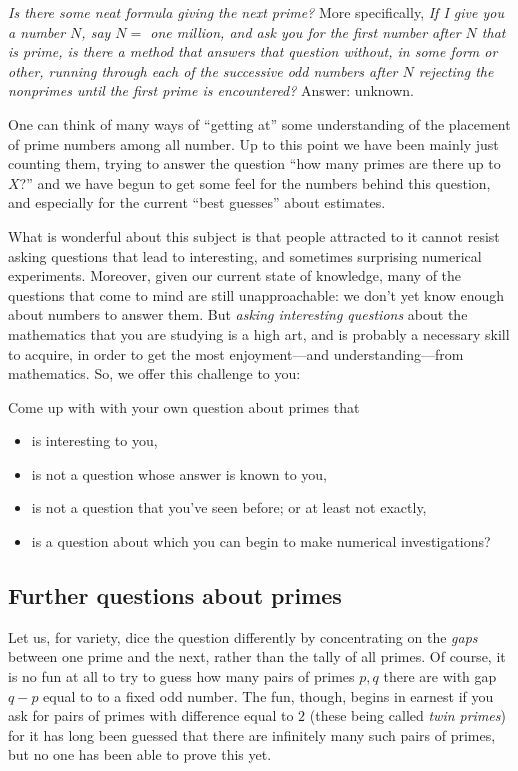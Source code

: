 \documentclass[11pt]{article}
\theoremstyle{plain}
\theoremstyle{definition}
\numberwithin{equation}{section}
\numberwithin{figure}{section}
\numberwithin{table}{section}
\begin{document}
{\em Is there some neat formula giving the next prime?} More
specifically, {\em If I give you a number $N$, say $N=$ one million,
  and ask you for the first number after $N$ that is prime, is there a
  method that answers that question without, in some form or other,
  running through each of the successive odd numbers after $N$ rejecting
  the nonprimes until the first prime is encountered?}  Answer:
unknown.

\bigskip

One can think of many ways of ``getting at'' some understanding of the
placement of prime numbers among all number.  Up to this point we have
been mainly just counting them, trying to answer the question ``how
many primes are there up to $X$?''  and we have begun to get some feel
for the numbers behind this question, and especially for the current
``best guesses'' about estimates.
   

What is wonderful about this subject is that people attracted to it
cannot resist asking questions that lead to interesting, and sometimes
surprising numerical experiments. Moreover, given our current state of
knowledge, many of the questions that come to mind are still
unapproachable: we don't yet know enough about numbers to answer them.
But {\it asking interesting questions} about the mathematics that you
are studying is a high art, and is probably a necessary skill to
acquire, in order to get the most enjoyment---and understanding---from
mathematics.  So, we offer this challenge to you:

Come up with with your own question about primes that
 \begin{itemize}
 \item     is interesting to you,
  \item    is not a question whose answer is known to you,
 \item     is not a question that you've seen before; or at least not exactly,
  \item    is a question about which you can begin to make numerical investigations? 
 \end{itemize}
 
\subsection{Further questions about primes} 

Let us, for variety, dice the question differently by concentrating on
the {\em gaps} between one prime and the next, rather than the tally
of all primes. Of course, it is no fun at all to try to guess how many
pairs of primes $p, q$ there are with gap $q-p$ equal to to a fixed
odd number.  The fun, though, begins in earnest if you ask for pairs
of primes with difference equal to $2$ (these being called {\em twin
  primes}) for it has long been guessed that there are infinitely many
such pairs of primes, but no one has been able to prove this yet.
\end{document}

